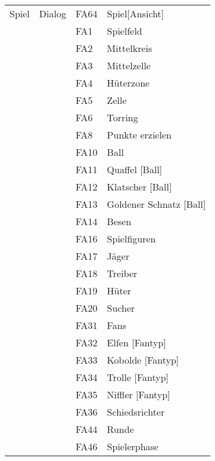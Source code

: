 \begin{figure}[H]
    \centering
    \begin{tabular}{|p{} p{} p{} p{}|}
        Spiel & Dialog & FA64 & Spiel[Ansicht]\\
        & & FA1 & Spielfeld\\
        & & FA2 & Mittelkreis\\
        & & FA3 & Mittelzelle\\
        & & FA4 & Hüterzone\\
        & & FA5 & Zelle\\
        & & FA6 & Torring\\
        & & FA8 & Punkte erzielen\\
        & & FA10 & Ball\\
        & & FA11 & Quaffel [Ball]\\
        & & FA12 & Klatscher [Ball]\\
        & & FA13 & Goldener Schnatz [Ball]\\
        & & FA14 & Besen\\
        & & FA16 & Spielfiguren\\
        & & FA17 & Jäger\\
        & & FA18 & Treiber\\
        & & FA19 & Hüter\\
        & & FA20 & Sucher\\
        & & FA31 & Fans\\
        & & FA32 & Elfen [Fantyp]\\
        & & FA33 & Kobolde [Fantyp]\\
        & & FA34 & Trolle [Fantyp]\\
        & & FA35 & Niffler [Fantyp]\\
        & & FA36 & Schiedsrichter\\
        & & FA44 & Runde\\
        & & FA46 & Spielerphase\\\hline
    \end{tabular}
\end{figure}


